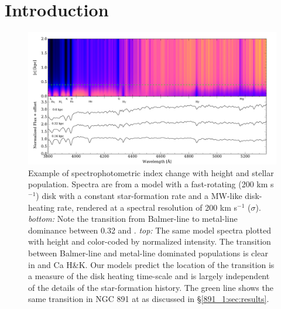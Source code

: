 \section{Introduction}
\label{891_1:sec:introduction}

\begin{figure}
  \centering
  \includegraphics[width=\textwidth]{891_1/figs/mab_stack.pdf}
  \caption[Heating signature in Milky Way
  model]{\label{fig:MW_heating}\fixspacing Example of
    spectrophotometric index change with height and stellar
    population. Spectra are from a model with a fast-rotating (200 km
    s$^{-1}$) disk with a constant star-formation rate and a MW-like
    disk-heating rate, rendered at a spectral resolution of 200 km
    s$^{-1}$ ($\sigma$).  \emph{bottom:} Note the transition from
    Balmer-line to metal-line dominance between 0.32 and
    . \emph{top:} The same model spectra plotted with
    height and color-coded by normalized intensity. The transition
    between Balmer-line and metal-line dominated populations is clear
    in \Hda and Ca H\&K. Our models predict the location of the
    transition is a measure of the disk heating time-scale and is
    largely independent of the details of the star-formation
    history. The green line shows the same transition in NGC 891 at
     as discussed in \S\ref{891_1:sec:results}.}
\end{figure}

